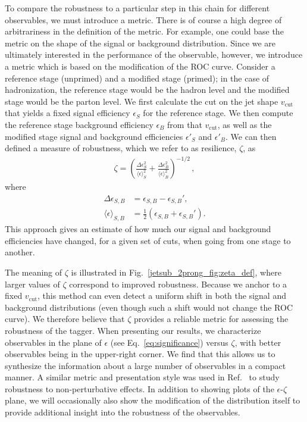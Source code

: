 \documentclass[11pt]{cernrep}
\begin{document}
To compare the robustness to a
particular step in this chain for different observables, we must
introduce a metric.
%
There is of course a high degree of arbitrariness
in the definition of the metric.
%
For example, one could base the metric on the shape of the signal or background distribution.
%
Since we are ultimately interested in the performance of the observable, however, we introduce a metric which is based on the modification of the ROC curve.
%
Consider a reference stage (unprimed) and a modified stage (primed); in the case of hadronization, the reference stage would be the hadron level and the modified stage would be the parton level.
%
We first calculate the cut on the jet shape $v_{\text{cut}}$ that yields a fixed signal efficiency $\epsilon_S$ for the reference stage.
%
We then compute the reference stage background efficiency $\epsilon_B$ from that $v_{\text{cut}}$, as well as the modified stage signal and background efficiencies $\epsilon'_S$ and $\epsilon'_B$.
%
We can then defined a measure of robustness, which we refer to as resilience, $\zeta$, as
%
\begin{align}
\zeta=\left(  \frac{\Delta \epsilon_S^2}{ \langle \epsilon \rangle_S^2}  +\frac{\Delta \epsilon_B^2}{ \langle \epsilon \rangle_B^2}  \right)^{-1/2}\,,
\end{align}
%
where
%
\begin{align}
\Delta \epsilon_{S,B} & =\epsilon_{S,B}-\epsilon_{S,B}',\\
\langle \epsilon \rangle_{S,B} & = \frac{1}{2} \left(\epsilon_{S,B} + \epsilon_{S,B}'\right).
\end{align}
%
This approach gives an estimate of how much our signal and background efficiencies have changed, for a given set of cuts, when going from one stage to another.

The meaning of $\zeta$ is illustrated in Fig.~\ref{jetsub_2prong_fig:zeta_def}, where larger values of $\zeta$ correspond to improved robustness.
%
Because we anchor to a fixed $v_{\text{cut}}$, this method can even detect a uniform shift in both the signal and background distributions (even though such a shift would not change the ROC curve).
%
We therefore believe that $\zeta$ provides a reliable metric for assessing the robustness of the tagger.
%
When presenting our results, we characterize observables
in the plane of $\epsilon$ (see Eq.~\eqref{eq:significance}) versus $\zeta$, with better observables being in
the upper-right corner.
%
We find that this allows us to synthesize the
information about a large number of observables in a compact manner.
%
A
similar metric and presentation style was used in Ref.~\cite{Dasgupta:2016ktv,Salam:2016yht}
to study robustness to non-perturbative effects.
%
In addition to
showing plots of the $\epsilon$-$\zeta$ plane, we will occasionally also show the modification of the distribution
itself to provide additional insight into the robustness of the
observables.
\end{document}
